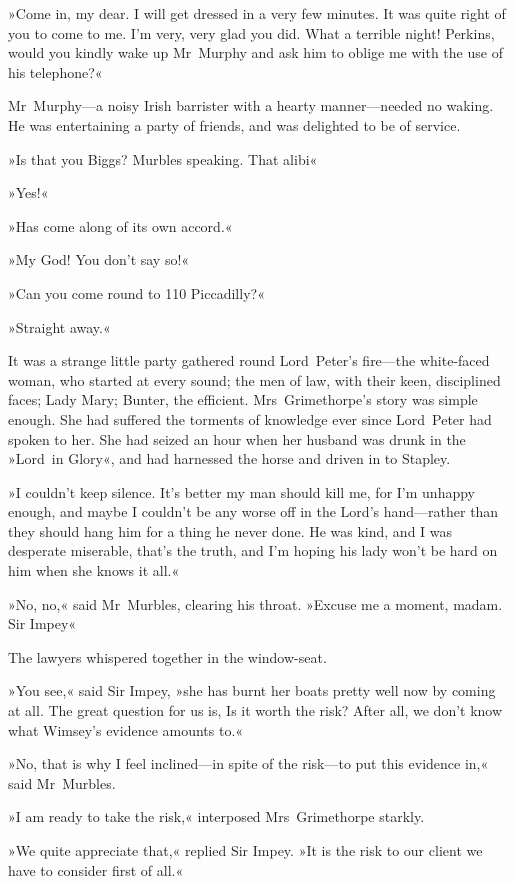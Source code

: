 »Come in, my dear. I will get dressed in a very few minutes. It was quite right of you to come to me. I'm very, very glad you did. What a terrible night! Perkins, would you kindly wake up Mr~Murphy and ask him to oblige me with the use of his telephone?«

Mr~Murphy—a noisy Irish barrister with a hearty manner—needed no waking. He was entertaining a party of friends, and was delighted to be of service.

»Is that you Biggs? Murbles speaking. That alibi\longdash«

»Yes!«

»Has come along of its own accord.«

»My God! You don't say so!«

»Can you come round to 110 Piccadilly?«

»Straight away.«

It was a strange little party gathered round Lord~Peter's fire—the white-faced woman, who started at every sound; the men of law, with their keen, disciplined faces; Lady Mary; Bunter, the efficient. Mrs~Grimethorpe's story was simple enough. She had suffered the torments of knowledge ever since Lord~Peter had spoken to her. She had seized an hour when her husband was drunk in the »Lord~in Glory«, and had harnessed the horse and driven in to Stapley.

»I couldn't keep silence. It's better my man should kill me, for I'm unhappy enough, and maybe I couldn't be any worse off in the Lord's hand—rather than they should hang him for a thing he never done. He was kind, and I was desperate miserable, that's the truth, and I'm hoping his lady won't be hard on him when she knows it all.«

»No, no,« said Mr~Murbles, clearing his throat. »Excuse me a moment, madam. Sir Impey\longdash«

The lawyers whispered together in the window-seat.

»You see,« said Sir Impey, »she has burnt her boats pretty well now by coming at all. The great question for us is, Is it worth the risk? After all, we don't know what Wimsey's evidence amounts to.«

»No, that is why I feel inclined—in spite of the risk—to put this evidence in,« said Mr~Murbles.

»I am ready to take the risk,« interposed Mrs~Grimethorpe starkly.

»We quite appreciate that,« replied Sir Impey. »It is the risk to our client we have to consider first of all.«

